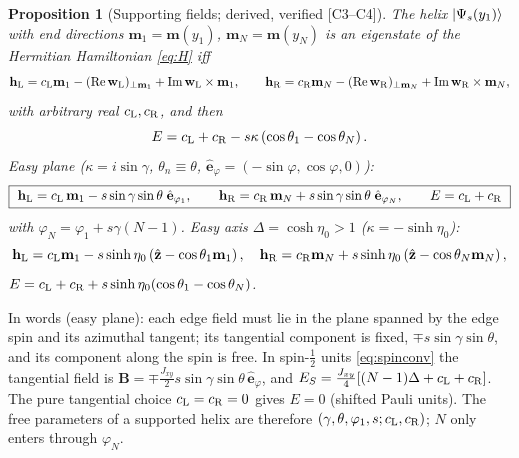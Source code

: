 \documentclass[11pt,a4paper]{article}
\newtheorem{proposition}[theorem]{Proposition}
\theoremstyle{definition}
\newcommand{\hL}{\mathbf h_{\mathrm L}}
\newcommand{\hR}{\mathbf h_{\mathrm R}}
\newcommand{\ez}{\hat{\mathbf z}}
\newcommand{\ver}[1]{\textsf{[#1]}}   %
\newcommand{\re}{\operatorname{Re}}
\newcommand{\im}{\operatorname{Im}}
\begin{document}
\begin{proposition}[Supporting fields; derived, verified \ver{C3--C4}]\label{prop:fields}
The helix $\ket{\Psi_s(y_1)}$ with end directions $\mathbf m_1=\mathbf m(y_1)$, $\mathbf m_N=\mathbf m(y_N)$ is an eigenstate of the Hermitian Hamiltonian \eqref{eq:H} iff
\begin{equation}\label{eq:fields-general}
\hL=c_{\rm L}\mathbf m_1-(\re\mathbf w_{\rm L})_{\perp\mathbf m_1}+\im\mathbf w_{\rm L}\times\mathbf m_1,\qquad
\hR=c_{\rm R}\mathbf m_N-(\re\mathbf w_{\rm R})_{\perp\mathbf m_N}+\im\mathbf w_{\rm R}\times\mathbf m_N,
\end{equation}
with arbitrary real $c_{\rm L},c_{\rm R}$, and then
\begin{equation}\label{eq:E-general}
E=c_{\rm L}+c_{\rm R}-s\kappa\left(\cos\theta_1-\cos\theta_N\right).
\end{equation}
\emph{Easy plane} ($\kappa=i\sin\gamma$, $\theta_n\equiv\theta$, $\hat{\mathbf e}_\varphi=(-\sin\varphi,\cos\varphi,0)$):
\begin{equation}\label{eq:fields-plane}
\boxed{\ \hL=c_{\rm L}\,\mathbf m_1-s\sin\gamma\sin\theta\;\hat{\mathbf e}_{\varphi_1},\qquad
\hR=c_{\rm R}\,\mathbf m_N+s\sin\gamma\sin\theta\;\hat{\mathbf e}_{\varphi_N},\qquad E=c_{\rm L}+c_{\rm R}\ }
\end{equation}
with $\varphi_N=\varphi_1+s\gamma(N-1)$. \emph{Easy axis} $\Delta=\cosh\eta_0>1$ ($\kappa=-\sinh\eta_0$):
\begin{equation}\label{eq:fields-axis}
\hL=c_{\rm L}\mathbf m_1-s\sinh\eta_0\left(\ez-\cos\theta_1\mathbf m_1\right),\quad \hR=c_{\rm R}\mathbf m_N+s\sinh\eta_0\left(\ez-\cos\theta_N\mathbf m_N\right),
\end{equation}
$E=c_{\rm L}+c_{\rm R}+s\sinh\eta_0(\cos\theta_1-\cos\theta_N)$.
\end{proposition}

In words (easy plane): each edge field must lie in the plane spanned by the edge spin and its azimuthal tangent; its tangential component is fixed, $\mp s\sin\gamma\sin\theta$, and its component along the spin is free. In spin-$\frac12$ units \eqref{eq:spinconv} the tangential field is $\mathbf B=\mp\frac{J_{xy}}2 s\sin\gamma\sin\theta\,\hat{\mathbf e}_\varphi$, and $E_S=\frac{J_{xy}}{4}[(N-1)\Delta+c_{\rm L}+c_{\rm R}]$. The pure tangential choice $c_{\rm L}=c_{\rm R}=0$ gives $E=0$ (shifted Pauli units). The free parameters of a supported helix are therefore $(\gamma,\theta,\varphi_1,s;c_{\rm L},c_{\rm R})$; $N$ only enters through $\varphi_N$.
\end{document}
